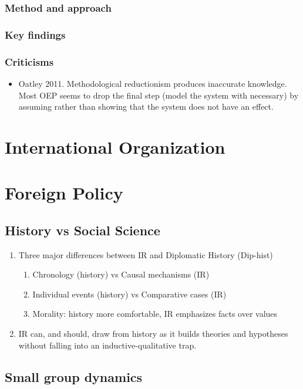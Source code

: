 \documentclass[11pt]{article}
\begin{document}
\subsubsection{Method and approach}
\label{sec-3-1-1}
\subsubsection{Key findings}
\label{sec-3-1-2}
\subsubsection{Criticisms}
\label{sec-3-1-3}
\begin{itemize}
\item Oatley 2011.
\label{sec-3-1-3-1}
Methodological reductionism produces inaccurate knowledge. Most OEP
seems to drop the final step (model the system with necessary) by
assuming rather than showing that the system does not have an effect.
\end{itemize}
\section{International Organization}
\label{sec-4}

\section{Foreign Policy}
\label{sec-5}
\subsection{History vs Social Science}
\label{sec-5-1}
\begin{enumerate}
\item Three major differences between IR and Diplomatic History (Dip-hist)
\begin{enumerate}
\item Chronology (history) vs Causal mechanisms (IR)
\item Individual events (history) vs Comparative cases (IR)
\item Morality: history more comfortable, IR emphasizes facts over values
\end{enumerate}
\item IR can, and should, draw from history as it builds theories and
hypotheses without falling into an inductive-qualitative trap.
\end{enumerate}
\subsection{Small group dynamics}
\label{sec-5-2}
\end{document}
